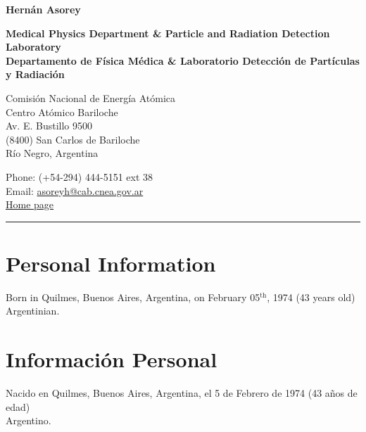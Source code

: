 \begin{center}{\huge \bf Hernán Asorey}\\[1cm]\end{center}

\begin{center}
\ifeng
{\bf{Medical Physics Department \& Particle and Radiation Detection Laboratory}}
\\
\else
{\bf{Departamento de Física Médica \& Laboratorio Detección de Partículas y Radiación}}\\
\fi
\end{center}
\begin{minipage}[t]{0.60\textwidth}
  Comisión Nacional de Energía Atómica\\
  Centro Atómico Bariloche\\
  Av. E. Bustillo 9500\\
  (8400) San Carlos de Bariloche\\
  Río Negro, Argentina\\[.2cm]
\end{minipage}
\begin{minipage}[t]{0.465\textwidth}
  Phone: (+54-294) 444-5151 ext 38\\
  Email: \href{mailto:asoreyh@cab.cnea.gov.ar}{asoreyh@cab.cnea.gov.ar}\\
  \href{http://fisica.cab.cnea.gov.ar/particulas/wiki/User:Asoreyh}{Home page}\\
\end{minipage}

\hrule

\ifeng
\section*{Personal Information}
Born in Quilmes, Buenos Aires, Argentina, on February 05$^\mathrm{th}$, 1974 (43 years old)\\
Argentinian.%
\else
\section*{Información Personal}
Nacido en Quilmes, Buenos Aires, Argentina, el 5 de Febrero de 1974 (43 años de edad)\\
Argentino.%
\fi
